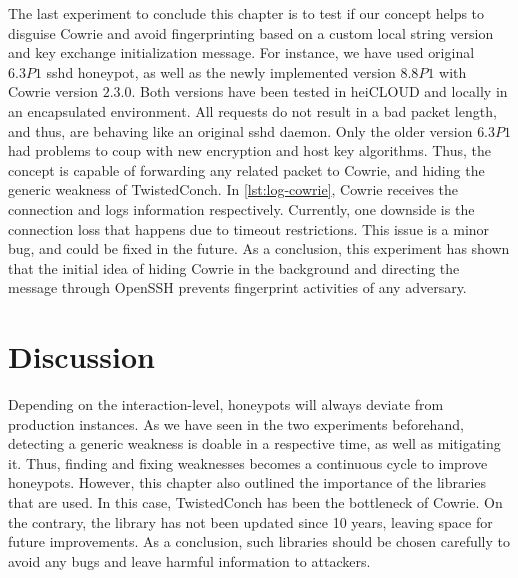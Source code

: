The last experiment to conclude this chapter is to test if our concept helps to disguise Cowrie and avoid fingerprinting based on a custom local string version and key exchange initialization message.
For instance, we have used \citet{vetterl2020} original $6.3P1$ sshd honeypot, as well as the newly implemented version $8.8P1$ with Cowrie version $2.3.0$.
Both versions have been tested in heiCLOUD and locally in an encapsulated environment.
All requests do not result in a bad packet length, and thus, are behaving like an original sshd daemon.
Only the older version $6.3P1$ had problems to coup with new encryption and host key algorithms.
Thus, the concept is capable of forwarding any related packet to Cowrie, and hiding the generic weakness of TwistedConch.
In \autoref{lst:log-cowrie}, Cowrie receives the connection and logs information respectively.
Currently, one downside is the connection loss that happens due to timeout restrictions.
This issue is a minor bug, and could be fixed in the future.
As a conclusion, this experiment has shown that the initial idea of hiding Cowrie in the background and directing the message through OpenSSH prevents fingerprint activities of any adversary.

\begin{figure}
    
\end{figure}

\section{Discussion}

Depending on the interaction-level, honeypots will always deviate from production instances.
As we have seen in the two experiments beforehand, detecting a generic weakness is doable in a respective time, as well as mitigating it.
Thus, finding and fixing weaknesses becomes a continuous cycle to improve honeypots.
However, this chapter also outlined the importance of the libraries that are used.
In this case, TwistedConch has been the bottleneck of Cowrie.
On the contrary, the library has not been updated since 10 years, leaving space for future improvements. 
As a conclusion, such libraries should be chosen carefully to avoid any bugs and leave harmful information to attackers.

